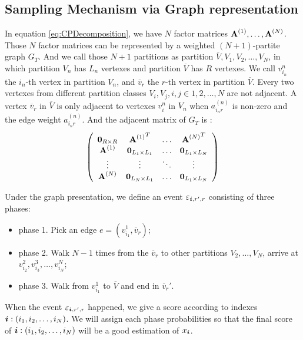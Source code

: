 \documentclass{article}
\newcommand{\Sca}[3]{{#1}^{(#2)}_{i_#2#3}}%
\newcommand{\V}[1]{{\bm{{\MakeLowercase{#1}}}}}
\newcommand{\M}[1]{{\bm{\mathbf{\MakeUppercase{#1}}}}}
\newcommand{\Mn}[2]{\M{#1}^{(#2)}}
\begin{document}
\subsection{Sampling Mechanism via Graph representation}

In equation \ref{eq:CPDecomposition}, we have $N$ factor matrices $\Mn{A}{1},\dots,\Mn{A}{N}$.
Those $N$ factor matrices can be represented by a weighted $(N+1)$-partite graph $G_{T}$. And we call those $N+1$ partitions as partition $\overline{V},V_{1},V_{2},\ldots,V_{N}$, in which partition $V_{n}$ has $L_n$ vertexes and partition $\overline{V}$ has $R$ vertexes. We call $v^n_{i_n}$ the $i_n$-th vertex in partition $V_{n}$, and $\overline{v}_{r}$ the $r$-th vertex in partition $\overline{V}$. Every two vertexes from different partition classes $V_i,V_j,i,j\in {1,2,\ldots,N}$ are not adjacent. A vertex $\overline{v}_r$ in $\overline{V}$ is only adjacent to vertexes $v^n_i$ in $V_n$ when $\Sca{a}{n}{r}$ is non-zero and the edge weight $\Sca{a}{n}{r}$. And the adjacent matrix of $G_{T}$ is :
\[
\left(
  \begin{array}{cccc}
    \M{0}_{R\times R}   & {\Mn{A}{1}}^T         & \ldots & {\Mn{A}{N}}^T \\
    \Mn{A}{1}           & \M{0}_{L_1\times L_1} & \ldots & \M{0}_{L_1\times L_N} \\
    \vdots              & \vdots                & \ddots & \vdots \\
    \Mn{A}{N}           & \M{0}_{L_N\times L_1} & \ldots & \M{0}_{L_1\times L_N} \\
  \end{array}
\right)
\]

Under the graph presentation, we define an event $\varepsilon_{\V{i},r',r}$  consisting of three phases:
\begin{itemize}
  \item phase 1. Pick an edge $e=(v^1_{i_1},\overline{v}_r)$;
  \item phase 2. Walk $N-1$ times from the $\overline{v}_r$ to other partitions $V_2,\ldots,V_N$, arrive at $v^2_{i_2},v^3_{i_3},\ldots,v^N_{i_N}$;
  \item phase 3. Walk from $v^1_{i_1}$ to $\overline{V}$ and end in $\overline{v}_r'$.
\end{itemize}

When the event $\varepsilon_{\V{i},r',r}$ happened, we give a score according to indexes $\V{i}:(i_1,i_2,\ldots,i_N)$. We will assign each phase probabilities so that the final score of $\V{i}:(i_1,i_2,\ldots,i_N)$ will be a good estimation of $x_{\V{i}}$.
\end{document}
